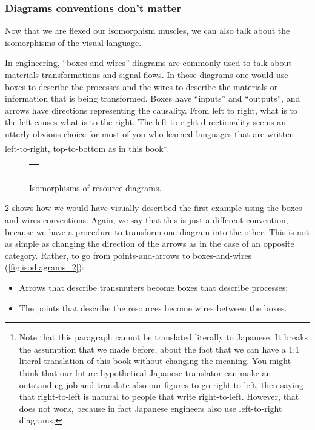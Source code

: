 \begin{figure}[h!]
  \centering
  \caption{}
  \label{fig:inverted_2}
\end{figure}

\subsubsection{Diagrams conventions don't matter}

Now that we are flexed our isomorphism muscles, we can also talk about the isomorphisms
of the visual language.

In engineering, ``boxes and wires'' diagrams are commonly used to talk about
materials transformations and signal flows. In those diagrams one would use
boxes to describe the processes and the wires to describe the materials or information
that is being transformed. Boxes have ``inputs'' and ``outputs'', and arrows have
directions representing the causality. From left to right, what is to the left causes what is to the right.
The left-to-right directionality seems an utterly obvious choice for most of you
who learned languages that are written left-to-right, top-to-bottom as in this book\footnote{
  Note that this paragraph cannot be translated literally to Japanese. It breaks the assumption
  that we made before, about the fact that we can have a 1:1 literal translation of this book
  without changing the meaning. You might think that our future hypothetical Japanese
  translator can make an outstanding job and translate also our figures to go right-to-left,
  then saying that right-to-left is natural to people that write right-to-left. However,
  that does not work, because in fact Japanese engineers also use left-to-right diagrams.}.

\begin{figure}[h!]
  \centering
  \begin{tabular}{c}
  {20_iso_diags_1}\\
  {20_iso_diags_2}
  \end{tabular}
  \caption{Isomorphisms of resource diagrams.  }
  \label{fig:isodiagrams}
\end{figure}


\cref{fig:isodiagrams} shows how we would have visually described
the first example using the boxes-and-wires conventions.
Again, we say that this is just a different convention, because
we have a procedure to transform one diagram into the other.
This is not as simple as changing the direction of the arrows as in the case of an
opposite category. Rather, to go from points-and-arrows to boxes-and-wires (\cref{fig:isodiagrams_2}):
\begin{itemize}
  \item Arrows that describe transmuters become boxes that describe processes;
  \item The points that describe the resources become wires between the boxes.
\end{itemize}

